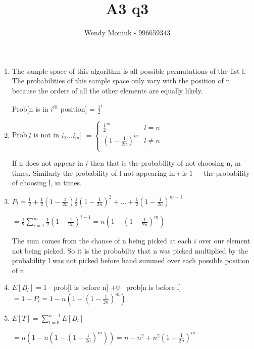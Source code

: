 \documentclass[10pt,a4paper]{article}
\author{Wendy Moniuk - 996659343}
\title{A3 q3}
\begin{document}
\begin{enumerate}
\item The sample space of this algorithm is all possible permutations of the list l. The probabilities of this sample space only vary with the position of n because the orders of all the other elements are equally likely.

Prob[n is in $i^{th}$
position] = $\frac{1}{2}^i$

\item Prob[$l$
 is not in $i_1 \dots i_m$] $ = \begin{cases}
 \frac{1}{2}^m 			& l = n\\
 (1-\frac{1}{2n})^{m} 	& l \neq n\\
 \end{cases}$
 
 If n does not appear in $i$ then that is the probability of not choosing n, m times. Similarly the probability of l not appearing in 
 $i$ is 
 $1 - $ the probability of choosing l, m times.
 
 \item $P_l = \frac{1}{2} + \frac{1}{2}(1-\frac{1}{2n}) \frac{1}{2}(1-\frac{1}{2n})^2 + \dots + \frac{1}{2}(1-\frac{1}{2n})^{m-1}$
 
 $ = \frac{1}{2}\sum\limits_{i = 1}^{m} \frac{1}{2}(1-\frac{1}{2n})^{i-1} = n(1-(1-\frac{1}{2n})^m)$
 
 The sum comes from the chance of n being picked at each $i$ over our element not being picked. So it is the probabilty that n was picked multiplied by the probability l was not picked before hand summed over each possible position of n. 
 
 \item $E[B_l] = 1\cdot $ prob[l is before n] 
 $ + 0\cdot $ prob[n is before l]
 $ = 1 - P_l = 1-n(1-(1-\frac{1}{2n})^m)$
 
 \item $E[T] = \sum\limits_{l = 0}^{n-1} E[B_l]$
 
 $ = n(1-n(1-(1-\frac{1}{2n})^m)) = n - n^2 + n^2(1-\frac{1}{2n})^m$
\end{enumerate}
\end{document}
